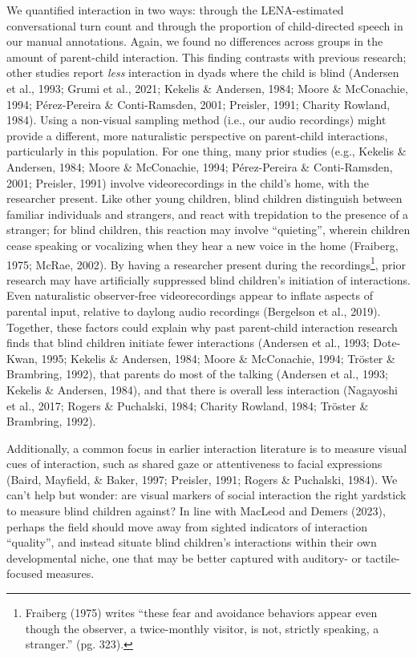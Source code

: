 \documentclass[
  man]{apa6}
\begin{document}
We quantified interaction in two ways: through the LENA-estimated conversational turn count and through the proportion of child-directed speech in our manual annotations. Again, we found no differences across groups in the amount of parent-child interaction. This finding contrasts with previous research; other studies report \emph{less} interaction in dyads where the child is blind (Andersen et al., 1993; Grumi et al., 2021; Kekelis \& Andersen, 1984; Moore \& McConachie, 1994; Pérez-Pereira \& Conti-Ramsden, 2001; Preisler, 1991; Charity Rowland, 1984). Using a non-visual sampling method (i.e., our audio recordings) might provide a different, more naturalistic perspective on parent-child interactions, particularly in this population. For one thing, many prior studies (e.g., Kekelis \& Andersen, 1984; Moore \& McConachie, 1994; Pérez-Pereira \& Conti-Ramsden, 2001; Preisler, 1991) involve videorecordings in the child's home, with the researcher present. Like other young children, blind children distinguish between familiar individuals and strangers, and react with trepidation to the presence of a stranger; for blind children, this reaction may involve ``quieting'', wherein children cease speaking or vocalizing when they hear a new voice in the home (Fraiberg, 1975; McRae, 2002). By having a researcher present during the recordings\footnote{Fraiberg (1975) writes ``these fear and avoidance behaviors appear even though the observer, a twice-monthly visitor, is not, strictly speaking, a stranger.'' (pg. 323).}, prior research may have artificially suppressed blind children's initiation of interactions. Even naturalistic observer-free videorecordings appear to inflate aspects of parental input, relative to daylong audio recordings (Bergelson et al., 2019). Together, these factors could explain why past parent-child interaction research finds that blind children initiate fewer interactions (Andersen et al., 1993; Dote-Kwan, 1995; Kekelis \& Andersen, 1984; Moore \& McConachie, 1994; Tröster \& Brambring, 1992), that parents do most of the talking (Andersen et al., 1993; Kekelis \& Andersen, 1984), and that there is overall less interaction (Nagayoshi et al., 2017; Rogers \& Puchalski, 1984; Charity Rowland, 1984; Tröster \& Brambring, 1992).

Additionally, a common focus in earlier interaction literature is to measure visual cues of interaction, such as shared gaze or attentiveness to facial expressions (Baird, Mayfield, \& Baker, 1997; Preisler, 1991; Rogers \& Puchalski, 1984). We can't help but wonder: are visual markers of social interaction the right yardstick to measure blind children against? In line with MacLeod and Demers (2023), perhaps the field should move away from sighted indicators of interaction ``quality'', and instead situate blind children's interactions within their own developmental niche, one that may be better captured with auditory- or tactile-focused measures.
\end{document}
